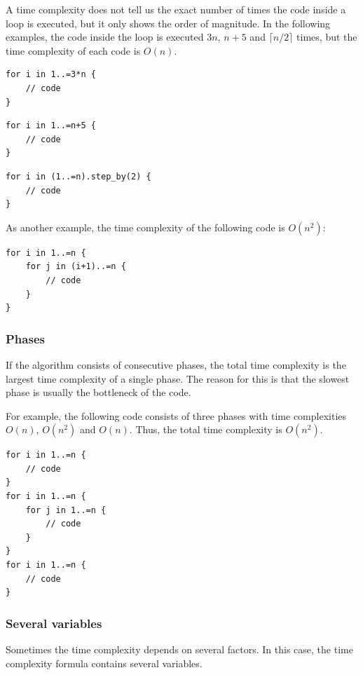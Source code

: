 A time complexity does not tell us the exact number
of times the code inside a loop is executed,
but it only shows the order of magnitude.
In the following examples, the code inside the loop
is executed $3n$, $n+5$ and $\lceil n/2 \rceil$ times,
but the time complexity of each code is $O(n)$.

\begin{lstlisting}
for i in 1..=3*n {
    // code
}
\end{lstlisting}

\begin{lstlisting}
for i in 1..=n+5 {
    // code
}
\end{lstlisting}

\begin{lstlisting}
for i in (1..=n).step_by(2) {
    // code
}
\end{lstlisting}

As another example,
the time complexity of the following code is $O(n^2)$:

\begin{lstlisting}
for i in 1..=n {
    for j in (i+1)..=n {
        // code
    }
}
\end{lstlisting}

\subsubsection*{Phases}

If the algorithm consists of consecutive phases,
the total time complexity is the largest
time complexity of a single phase.
The reason for this is that the slowest
phase is usually the bottleneck of the code.

For example, the following code consists
of three phases with time complexities
$O(n)$, $O(n^2)$ and $O(n)$.
Thus, the total time complexity is $O(n^2)$.

\begin{lstlisting}
for i in 1..=n {
    // code
}
for i in 1..=n {
    for j in 1..=n {
        // code
    }
}
for i in 1..=n {
    // code
}
\end{lstlisting}

\subsubsection*{Several variables}

Sometimes the time complexity depends on
several factors.
In this case, the time complexity formula
contains several variables.

